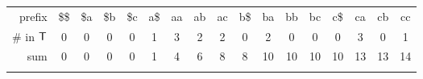 \begin{tabular}{!{\color{white}\vrule} r !{\color{white}\vrule} c !{\color{white}\vrule} c !{\color{white}\vrule} c !{\color{white}\vrule} c !{\color{white}\vrule} c !{\color{white}\vrule} c !{\color{white}\vrule} c !{\color{white}\vrule} c !{\color{white}\vrule} c !{\color{white}\vrule} c !{\color{white}\vrule} c !{\color{white}\vrule} c !{\color{white}\vrule} c !{\color{white}\vrule} c !{\color{white}\vrule} c !{\color{white}\vrule} c !{\color{white}\vrule}}
	\hline
	prefix & \$\$ & \$a & \$b & \$c & a\$ & aa & ab & ac & b\$ & ba & bb & bc & c\$ & ca & cb & cc \\
	\hline
	\hline
	\# in \(\inputtext\) & 0 & 0 & 0 & 0 & 1 & 3 & 2 & 2 & 0 & 2 & 0 & 0 & 0 & 3 & 0 & 1 \\
	\hline
	sum         & 0 & 0 & 0 & 0 & 1 & 4 & 6 & 8 & 8 & 10 & 10 & 10 & 10 & 13 & 13 & 14 \\
	\hline
\end{tabular}
